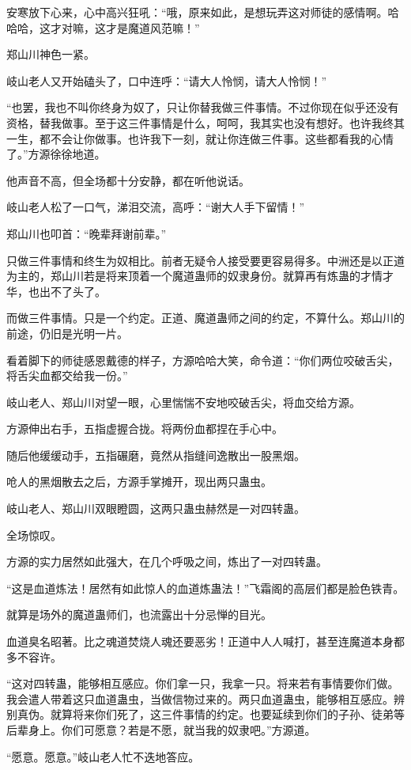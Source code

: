 \begin{this_body}
安寒放下心来，心中高兴狂吼：“哦，原来如此，是想玩弄这对师徒的感情啊。哈哈哈，这才对嘛，这才是魔道风范嘛！”

郑山川神色一紧。

岐山老人又开始磕头了，口中连呼：“请大人怜悯，请大人怜悯！”

“也罢，我也不叫你终身为奴了，只让你替我做三件事情。不过你现在似乎还没有资格，替我做事。至于这三件事情是什么，呵呵，我其实也没有想好。也许我终其一生，都不会让你做事。也许我下一刻，就让你连做三件事。这些都看我的心情了。”方源徐徐地道。

他声音不高，但全场都十分安静，都在听他说话。

岐山老人松了一口气，涕泪交流，高呼：“谢大人手下留情！”

郑山川也叩首：“晚辈拜谢前辈。”

只做三件事情和终生为奴相比。前者无疑令人接受要更容易得多。中洲还是以正道为主的，郑山川若是将来顶着一个魔道蛊师的奴隶身份。就算再有炼蛊的才情才华，也出不了头了。

而做三件事情。只是一个约定。正道、魔道蛊师之间的约定，不算什么。郑山川的前途，仍旧是光明一片。

看着脚下的师徒感恩戴德的样子，方源哈哈大笑，命令道：“你们两位咬破舌尖，将舌尖血都交给我一份。”

岐山老人、郑山川对望一眼，心里惴惴不安地咬破舌尖，将血交给方源。

方源伸出右手，五指虚握合拢。将两份血都捏在手心中。

随后他缓缓动手，五指碾磨，竟然从指缝间逸散出一股黑烟。

呛人的黑烟散去之后，方源手掌摊开，现出两只蛊虫。

岐山老人、郑山川双眼瞪圆，这两只蛊虫赫然是一对四转蛊。

全场惊叹。

方源的实力居然如此强大，在几个呼吸之间，炼出了一对四转蛊。

“这是血道炼法！居然有如此惊人的血道炼蛊法！”飞霜阁的高层们都是脸色铁青。

就算是场外的魔道蛊师们，也流露出十分忌惮的目光。

血道臭名昭著。比之魂道焚烧人魂还要恶劣！正道中人人喊打，甚至连魔道本身都多不容许。

“这对四转蛊，能够相互感应。你们拿一只，我拿一只。将来若有事情要你们做。我会遣人带着这只血道蛊虫，当做信物过来的。两只血道蛊虫，能够相互感应。辨别真伪。就算将来你们死了，这三件事情的约定。也要延续到你们的子孙、徒弟等后辈身上。你们可愿意？若是不愿，就当我的奴隶吧。”方源道。

“愿意。愿意。”岐山老人忙不迭地答应。


\end{this_body}
